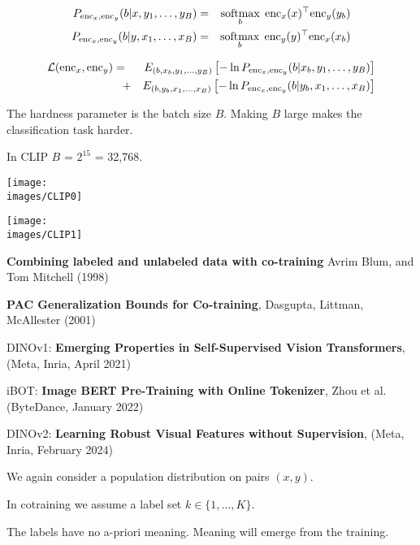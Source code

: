 {{\vfill
\begin{eqnarray*}
P_{\mathrm{enc}_x,\mathrm{enc}_y}(b|x,y_1,\ldots,y_B) & = & \operatorname*{softmax}_b\; \mathrm{enc}_x(x)^\top\mathrm{enc}_y(y_b) \\
P_{\mathrm{enc}_x,\mathrm{enc}_y}(b|y,x_1,\ldots,x_B) & = & \operatorname*{softmax}_b\; \mathrm{enc}_y(y)^\top\mathrm{enc}_x(x_b) \\
\end{eqnarray*}
}



{\huge
\begin{eqnarray*}
{\cal L}(\mathrm{enc}_x,\mathrm{enc}_y) & = & E_{(b,x_b,y_1,\ldots,y_B)}\left[-\ln P_{\mathrm{enc}_x,\mathrm{enc}_y}(b|x_b,y_1,\ldots,y_B)\right] \\
& \;\;\;+ & E_{(b,y_b,x_1,\ldots,x_B)}\left[-\ln P_{\mathrm{enc}_x,\mathrm{enc}_y}(b|y_b,x_1,\ldots,x_B)\right]
\end{eqnarray*}

\vfill
The hardness parameter is the batch size $B$.  Making $B$ large makes the classification task harder.

\vfill
In CLIP $B$ = $2^{15}$ = 32,768.


\centerline{\texttt{[image: \\images/CLIP0]}}


\centerline{\texttt{[image: \\images/CLIP1]}}



{\bf Combining labeled and unlabeled data with co-training} Avrim Blum, and Tom Mitchell (1998)

\vfill
{\bf PAC Generalization Bounds for Co-training}, Dasgupta, Littman, McAllester (2001)

\vfill
DINOv1: {\bf Emerging Properties in Self-Supervised Vision Transformers}, (Meta, Inria, April 2021)

\vfill
iBOT: {\bf Image BERT Pre-Training with Online Tokenizer},
Zhou et al. (ByteDance, January 2022)

\vfill
DINOv2: {\bf Learning Robust Visual Features without Supervision}, (Meta, Inria, February 2024)


We again consider a population distribution on pairs $(x,y)$.

\vfill
In cotraining we assume a label set $k \in \{1,\ldots,K\}$.

\vfill
The labels have no a-priori meaning.  Meaning will emerge from the training.

}}
